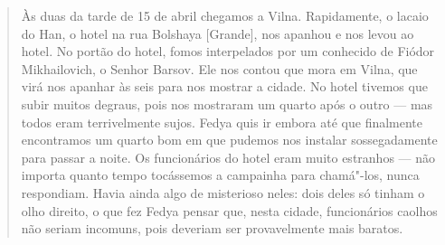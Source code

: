 \begin{quote}
Às duas da tarde de 15 de abril chegamos a Vilna. Rapidamente, o lacaio
do Han, o hotel na rua Bolshaya {[}Grande{]}, nos apanhou e nos levou ao
hotel. No portão do hotel, fomos interpelados por um conhecido de Fiódor
Mikhailovich, o Senhor Barsov. Ele nos contou que mora em Vilna, que
virá nos apanhar às seis para nos mostrar a cidade. No hotel tivemos que
subir muitos degraus, pois nos mostraram um quarto após o outro --- mas
todos eram terrivelmente sujos. Fedya quis ir embora até que finalmente
encontramos um quarto bom em que pudemos nos instalar sossegadamente
para passar a noite. Os funcionários do hotel eram muito estranhos --- não
importa quanto tempo tocássemos a campainha para chamá"-los, nunca
respondiam. Havia ainda algo de misterioso neles: dois deles só tinham o
olho direito, o que fez Fedya pensar que, nesta cidade, funcionários
caolhos não seriam incomuns, pois deveriam ser provavelmente mais
baratos.

%


\end{quote}
